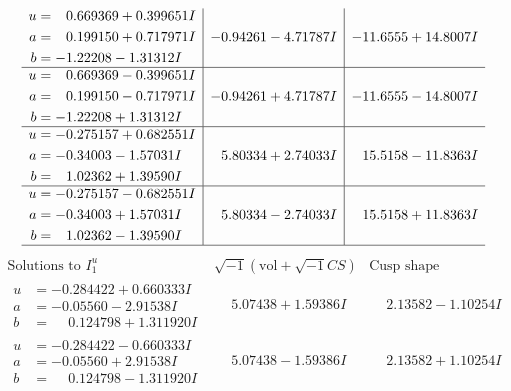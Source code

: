 \documentclass[1p]{elsarticle_modified}
\theoremstyle{definition}
\newcommand{\I}{\sqrt{-1}}
\begin{document}
$$\begin{array}{c|c|c}
\begin{aligned}
u &= \phantom{-}0.669369 + 0.399651 I \\
a &= \phantom{-}0.199150 + 0.717971 I \\
b &= -1.22208 - 1.31312 I\end{aligned}
 & -0.94261 - 4.71787 I & -11.6555 + 14.8007 I \\ \hline\begin{aligned}
u &= \phantom{-}0.669369 - 0.399651 I \\
a &= \phantom{-}0.199150 - 0.717971 I \\
b &= -1.22208 + 1.31312 I\end{aligned}
 & -0.94261 + 4.71787 I & -11.6555 - 14.8007 I \\ \hline\begin{aligned}
u &= -0.275157 + 0.682551 I \\
a &= -0.34003 - 1.57031 I \\
b &= \phantom{-}1.02362 + 1.39590 I\end{aligned}
 & \phantom{-}5.80334 + 2.74033 I & \phantom{-}15.5158 - 11.8363 I \\ \hline\begin{aligned}
u &= -0.275157 - 0.682551 I \\
a &= -0.34003 + 1.57031 I \\
b &= \phantom{-}1.02362 - 1.39590 I\end{aligned}
 & \phantom{-}5.80334 - 2.74033 I & \phantom{-}15.5158 + 11.8363 I\\
 \hline 
 \end{array}$$\newpage$$\begin{array}{c|c|c}  
\text{Solutions to }I^u_{1}& \I (\text{vol} + \sqrt{-1}CS) & \text{Cusp shape}\\
 \hline 
\begin{aligned}
u &= -0.284422 + 0.660333 I \\
a &= -0.05560 - 2.91538 I \\
b &= \phantom{-}0.124798 + 1.311920 I\end{aligned}
 & \phantom{-}5.07438 + 1.59386 I & \phantom{-}2.13582 - 1.10254 I \\ \hline\begin{aligned}
u &= -0.284422 - 0.660333 I \\
a &= -0.05560 + 2.91538 I \\
b &= \phantom{-}0.124798 - 1.311920 I\end{aligned}
 & \phantom{-}5.07438 - 1.59386 I & \phantom{-}2.13582 + 1.10254 I \\ \hline\begin{aligned}

\end{aligned}
\end{array}$$
\end{document}
